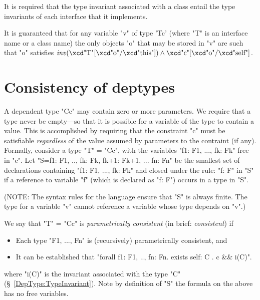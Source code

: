 It is required that the
type invariant associated with a class entail the type invariants of
each interface that it implements.

It is guaranteed that for any variable \xcd"v" of
type \xcd'T{c}' (where \xcd"T" is an interface name or a class name) the only
objects \xcd"o" that may be stored in \xcd"v" are such that \xcd"o" satisfies
$\mathit{inv}(\mbox{\xcd"T"}[\mbox{\xcd"o"}/\mbox{\xcd"this"}])
\wedge \mbox{\xcd"c"}[\mbox{\xcd"o"}/\mbox{\xcd"self"}]$.


\section{Consistency of deptypes}\label{DepType:Consistency}

A dependent type \xcd"C{c}" may contain zero or more parameters. We require
that a type never be empty---so that it is possible for a variable of
the type to contain a value. This is accomplished by requiring that
the constraint \xcd"c" must be satisfiable {\em regardless} of the value assumed
by parameters to the contraint (if any). Formally, consider a type
\xcd"T" = \xcd"C{c}", with the variables \xcd"f1: F1, ..., fk: Fk"
free in \xcd"c".  Let 
\xcd"S={f1: F1, .., fk: Fk, fk+1: Fk+1, ... fn: Fn}" be the smallest set of
declarations containing \xcd"f1: F1, ..., fk: Fk" and closed under the rule:
\xcd"f: F" in \xcd"S" if a reference to variable \xcd"f" (which
is declared as \xcd"f: F") occurs in a type in \xcd"S".

(NOTE: The syntax rules for the language ensure that \xcd"S" is always
finite. The type for a variable \xcd"v" cannot reference a variable whose
type depends on \xcd"v".)

We say that \xcd"T" = \xcd"C{c}" is {\em parametrically consistent} (in brief:
{\em consistent}) if

\begin{itemize}
  \item Each type \xcd"F1, ..., Fn" is (recursively) parametrically consistent, and
\item It can be established that \xcd"forall f1: F1, .., fn: Fn.  exists self: C . c && i(C)".
\end{itemize}
\noindent where \xcd"i(C)" is the invariant associated with the type \xcd"C"
(\S~\ref{DepType:TypeInvariant}).  Note by definition of \xcd"S" the formula on the
above has no free variables.

